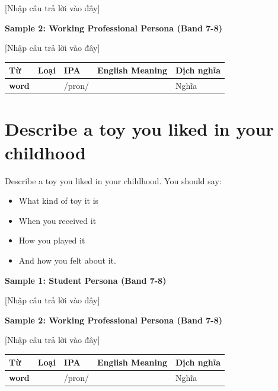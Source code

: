 [Nhập câu trả lời vào đây]

\textbf{Sample 2: Working Professional Persona (Band 7-8)}

[Nhập câu trả lời vào đây]

\separator


\vspace{0.8em}
\begin{center}
\renewcommand{\arraystretch}{1.65}
\begin{tabularx}{\textwidth}{|V{0.22\textwidth}|C{0.07\textwidth}|I{0.20\textwidth}|Y|V{0.18\textwidth}|}
\hline
{}
\textbf{Từ} & \textbf{Loại} & \textbf{IPA} & \textbf{English Meaning} & \textbf{Dịch nghĩa} \\
\hline
\textbf{word} & & /pron/ & & Nghĩa \\ \hline
\end{tabularx}
\end{center}

\newpage

\section{Describe a toy you liked in your childhood}
\begin{ieltsprompt}
Describe a toy you liked in your childhood.
You should say:
\begin{itemize}[leftmargin=2em, itemsep=2pt]
\item What kind of toy it is
\item When you received it
\item How you played it
\item And how you felt about it.
\end{itemize}
\end{ieltsprompt}
\begin{ieltsanswer}
\textbf{Sample 1: Student Persona (Band 7-8)}

[Nhập câu trả lời vào đây]

\textbf{Sample 2: Working Professional Persona (Band 7-8)}

[Nhập câu trả lời vào đây]
\end{ieltsanswer}


\vspace{0.8em}
\begin{center}
\renewcommand{\arraystretch}{1.65}
\begin{tabularx}{\textwidth}{|V{0.22\textwidth}|C{0.07\textwidth}|I{0.20\textwidth}|Y|V{0.18\textwidth}|}
\hline
{}
\textbf{Từ} & \textbf{Loại} & \textbf{IPA} & \textbf{English Meaning} & \textbf{Dịch nghĩa} \\
\hline
\textbf{word} & & /pron/ & & Nghĩa \\ \hline
\end{tabularx}
\end{center}

